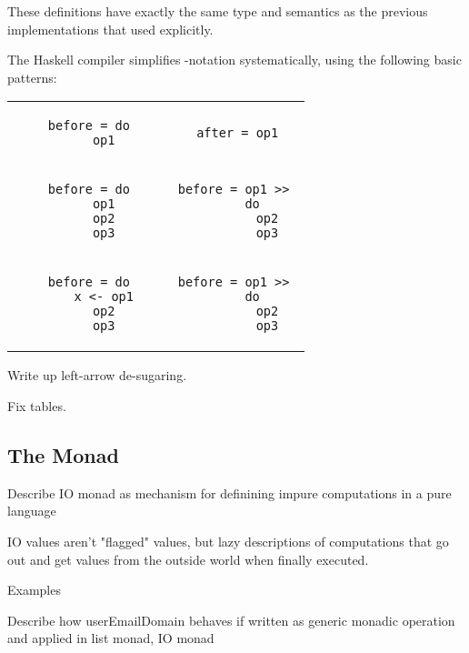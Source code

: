 These definitions have exactly the same type and semantics as the previous implementations that used \code{(>>=)} explicitly.

The Haskell compiler simplifies -notation systematically, using the following basic patterns:
 

\begin{table}[h]
\begin{tabular}{c c}
    \begin{lstlisting}
    before = do
        op1
    \end{lstlisting}
    &
    \begin{lstlisting}
    after = op1
    \end{lstlisting} \\

    \begin{lstlisting}
    before = do
        op1
        op2
        op3
    \end{lstlisting}
    &
    \begin{lstlisting}
    before = op1 >> 
        do
            op2
            op3

    \end{lstlisting} \\

    \begin{lstlisting}
    before = do
        x <- op1
        op2
        op3
    \end{lstlisting}
    &
    \begin{lstlisting}
    before = op1 >> 
        do
            op2
            op3

    \end{lstlisting} \\
\end{tabular}
\end{table}

\begin{notelist}
    \item Write up left-arrow de-sugaring.
    \item Fix tables.
\end{notelist}

\subsection{The  Monad}

\begin{notelist}
    \item Describe IO monad as mechanism for definining impure computations in a pure language
    \item IO values aren't "flagged" values, but lazy descriptions of computations that go out and get values from
          the outside world when finally executed.
    \item Examples
    \item Describe how userEmailDomain behaves if written as generic monadic operation and applied in list monad, IO monad
\end{notelist}

